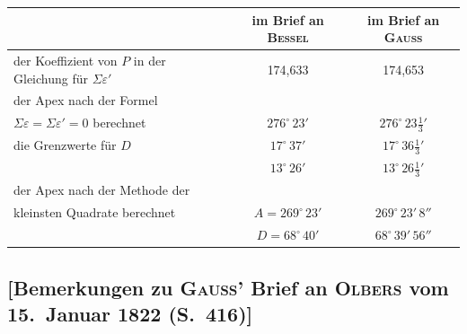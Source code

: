\documentclass[12pt,a4paper]{article}
\theoremstyle{plain}
\theoremstyle{definition}
\theoremstyle{remark}
\begin{document}
\begin{small}
\begin{center}
\begin{tabular}{l|c|c}
& im Brief an \textsc{Bessel} & im Brief an \textsc{Gauss} \\
\hline
\hline
\rule{0pt}{12pt}der Koeffizient von $P$ in der Gleichung f\"ur $\Sigma\varepsilon'$ & 174,633 & 174,653 \\
\hline
\rule{0pt}{12pt}der Apex nach der Formel & & \\
$\Sigma\varepsilon = \Sigma\varepsilon' = 0$ berechnet & $276^{\circ}\,23'$ & $276^{\circ}\,23\frac{1}{3}'$ \\
\hline
\rule{0pt}{12pt}die Grenzwerte f\"ur $D$ & $17^{\circ}\,37'$ & $17^{\circ}\,36\frac{1}{3}'$ \\
& $13^{\circ}\,26'$ & $13^{\circ}\,26\frac{1}{3}'$ \\
\hline
\rule{0pt}{12pt}der Apex nach der Methode der & & \\
kleinsten Quadrate berechnet & $A = 269^{\circ}\,23'$ & $269^{\circ}\,23'\,8''$ \\
& $D = 68^{\circ}\,40'$ & $68^{\circ}\,39'\,56''$ \\
\end{tabular}
\end{center}
\end{small}

\newpage
\subsection*{[Bemerkungen zu \textsc{Gauss'} Brief an \textsc{Olbers} vom 15.~Januar 1822 (S.~416)]}
\end{document}
